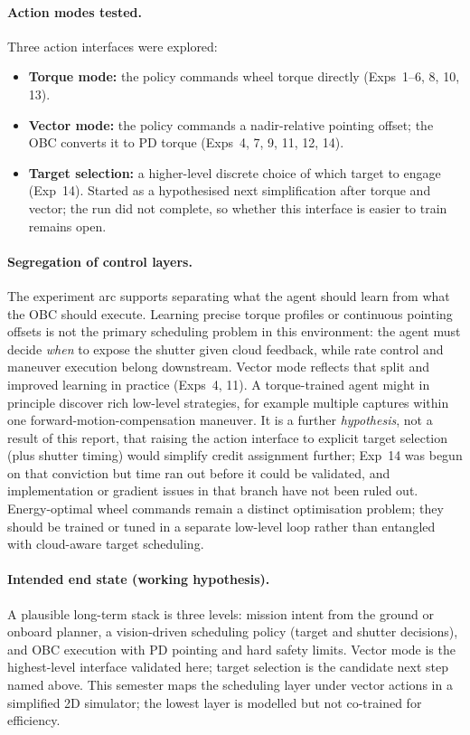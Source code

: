 \paragraph{Action modes tested.}
Three action interfaces were explored:
\begin{itemize}
  \item \textbf{Torque mode:} the policy commands wheel torque directly (Exps~1--6, 8, 10, 13).
  \item \textbf{Vector mode:} the policy commands a nadir-relative pointing offset; the OBC converts it to PD torque (Exps~4, 7, 9, 11, 12, 14).
  \item \textbf{Target selection:} a higher-level discrete choice of which target to engage (Exp~14).
    Started as a hypothesised next simplification after torque and vector; the run did not complete, so whether this interface is easier to train remains open.
\end{itemize}

\paragraph{Segregation of control layers.}
The experiment arc supports separating what the agent should learn from what the OBC should execute.
Learning precise torque profiles or continuous pointing offsets is not the primary scheduling problem in this environment: the agent must decide \emph{when} to expose the shutter given cloud feedback, while rate control and maneuver execution belong downstream.
Vector mode reflects that split and improved learning in practice (Exps~4, 11).
A torque-trained agent might in principle discover rich low-level strategies, for example multiple captures within one forward-motion-compensation maneuver.
It is a further \emph{hypothesis}, not a result of this report, that raising the action interface to explicit target selection (plus shutter timing) would simplify credit assignment further; Exp~14 was begun on that conviction but time ran out before it could be validated, and implementation or gradient issues in that branch have not been ruled out.
Energy-optimal wheel commands remain a distinct optimisation problem; they should be trained or tuned in a separate low-level loop rather than entangled with cloud-aware target scheduling.

\paragraph{Intended end state (working hypothesis).}
A plausible long-term stack is three levels: mission intent from the ground or onboard planner, a vision-driven scheduling policy (target and shutter decisions), and OBC execution with PD pointing and hard safety limits.
Vector mode is the highest-level interface validated here; target selection is the candidate next step named above.
This semester maps the scheduling layer under vector actions in a simplified 2D simulator; the lowest layer is modelled but not co-trained for efficiency.

